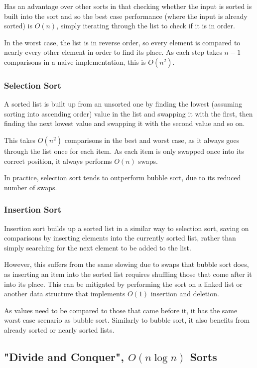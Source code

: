 \documentclass[]{article}
\begin{document}
Has an advantage over other sorts in that checking whether the input is sorted is built into the sort and so the best case performance (where the input is already sorted) is $O(n)$, simply iterating through the list to check if it is in order.

In the worst case, the list is in reverse order, so every element is compared to nearly every other element in order to find its place. As each step takes $n - 1$ comparisons in a naive implementation, this is $O(n^2)$.

\subsubsection{Selection Sort}

A sorted list is built up from an unsorted one by finding the lowest (assuming sorting into ascending order) value in the list and swapping it with the first, then finding the next lowest value and swapping it with the second value and so on.

This takes $O(n^2)$ comparisons in the best and worst case, as it always goes through the list once for each item. As each item is only swapped once into its correct position, it always performs $O(n)$ swaps.

In practice, selection sort tends to outperform bubble sort, due to its reduced number of swaps.

\subsubsection{Insertion Sort}

Insertion sort builds up a sorted list in a similar way to selection sort, saving on comparisons by inserting elements into the currently sorted list, rather than simply searching for the next element to be added to the list.

However, this suffers from the same slowing due to swaps that bubble sort does, as inserting an item into the sorted list requires shuffling those that come after it into its place. This can be mitigated by performing the sort on a linked list or another data structure that implements $O(1)$ insertion and deletion.

As values need to be compared to those that came before it, it has the same worst case scenario as bubble sort. Similarly to bubble sort, it also benefits from already sorted or nearly sorted lists.

\pagebreak

\subsection{"Divide and Conquer", $O(n\log{n})$ Sorts}
\end{document}
